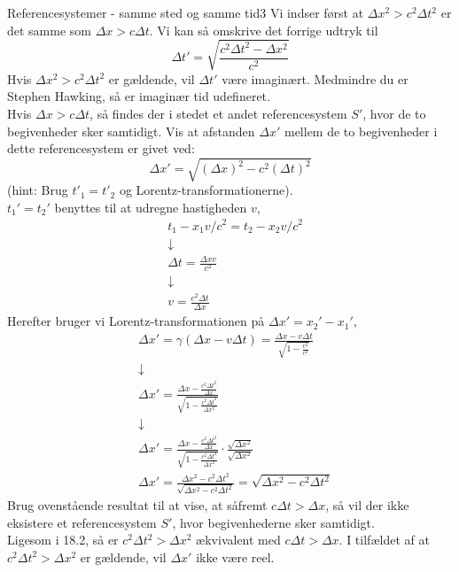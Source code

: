 \begin{opgave}{Referencesystemer - samme sted og samme tid}{3}
	Vi indser først at $\Delta x^2 > c^2\Delta t^2$ er det samme som $\Delta x > c\Delta t$. Vi kan så omskrive det forrige udtryk til
	$$\Delta t'=\sqrt{\frac{c^2\Delta t^2-\Delta x^2}{c^2}}$$
	Hvis $\Delta x^2 > c^2\Delta t^2$ er gældende, vil $\Delta t'$ være imaginært. Medmindre du er Stephen Hawking, så er imaginær tid udefineret.\\
	\opg Hvis $\Delta x > c \Delta t$, så findes der i stedet et andet referencesystem $S'$, hvor de to begivenheder sker samtidigt. Vis at afstanden $\Delta x'$ mellem de to begivenheder i dette referencesystem er givet ved:
	$$\Delta x' = \sqrt{\left( \Delta x \right)^2 - c^2 \left( \Delta t \right)^2}$$
	(hint: Brug $t'_1 = t'_2$ og Lorentz-transformationerne).\\
	
	$t_1'=t_2'$ benyttes til at udregne hastigheden $v$,
	\begin{align*}
	&t_1-x_1v/c^2=t_2-x_2v/c^2 \\
	&\downarrow \\
	&\Delta t=\frac{\Delta x v}{c^2} \\
	&\downarrow \\
	&v=\frac{c^2\Delta t}{\Delta x}
	\end{align*}
	Herefter bruger vi Lorentz-transformationen på $\Delta x'= x_2'-x_1'$,
	\begin{align*}
	&\Delta x'=\gamma(\Delta x-v\Delta t)=\frac{\Delta x-v\Delta t}{\sqrt{1-\frac{v^2}{c^2}}} \\
	&\downarrow \\
	&\Delta x'=\frac{\Delta x-\frac{c^2\Delta t^2}{\Delta x}}{\sqrt{1-\frac{c^2\Delta t^2}{\Delta x^2}}} \\
	&\downarrow \\
	&\Delta x'=\frac{\Delta x-\frac{c^2\Delta t^2}{\Delta x}}{\sqrt{1-\frac{c^2\Delta t^2}{\Delta x^2}}} \cdot \frac{\sqrt{\Delta x^2}}{\sqrt{\Delta x^2}} \\
	&\Delta x'=\frac{\Delta x^2-c^2\Delta t^2}{\sqrt{\Delta x^2-c^2\Delta t^2}} = \sqrt{\Delta x^2-c^2\Delta t^2}
	\end{align*}
	\opg Brug ovenstående resultat til at vise, at såfremt $c \Delta t > \Delta x$, så vil der ikke eksistere et referencesystem $S'$, hvor begivenhederne sker samtidigt.\\
	
		Ligesom i 18.2, så er $c^2\Delta t^2 > \Delta x^2$ ækvivalent med $c\Delta t > \Delta x$. I tilfældet af at $c^2\Delta t^2 > \Delta x^2$ er gældende, vil $\Delta x'$ ikke være reel.
\end{opgave}


